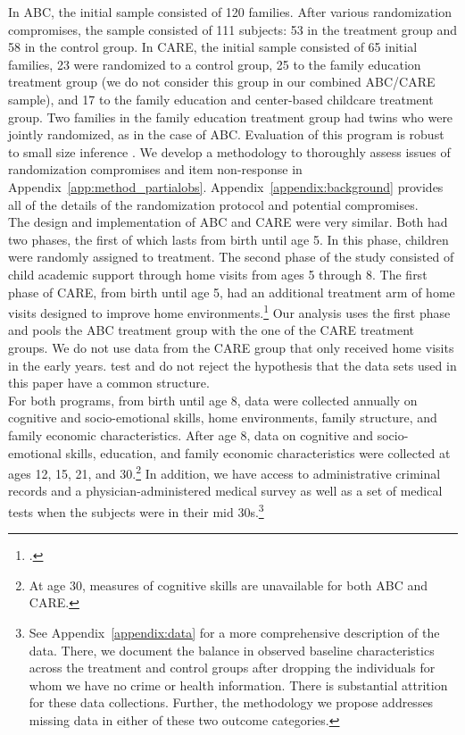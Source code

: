 \noindent In ABC, the initial sample consisted of 120 families. After various randomization compromises, the sample consisted of 111 subjects: 53 in the treatment group and 58 in the control group. In CARE, the initial sample consisted of 65 initial families, 23 were randomized to a control group, 25 to the family education treatment group (we do not consider this group in our combined ABC/CARE sample), and 17 to the family education and center-based childcare treatment group. Two families in the family education treatment group had twins who were jointly randomized, as in the case of ABC. Evaluation of this program is robust to small size inference \citep{Campbell_Conti_etal_2014_EarlyChildhoodInvestments}. We  develop a methodology to thoroughly assess issues of randomization compromises and item non-response in Appendix~\ref{app:method_partialobs}. Appendix~\ref{appendix:background} provides all of the details of the randomization protocol and potential compromises.\\

\noindent The design and implementation of ABC and CARE were very similar. Both had two phases, the first of which lasts from birth until age 5. In this phase, children were randomly assigned to treatment. The second phase of the study consisted of child academic support through home visits from ages 5 through 8. The first phase of CARE, from birth until age 5, had an additional treatment arm of home visits designed to improve home environments.\footnote{\citet{Wasik_Ramey_etal_1990_CD}.} Our analysis uses the first phase and pools the ABC treatment group with the one of the CARE treatment groups. We do not use data from the CARE group that only received home visits in the early years. \cite{Campbell_Conti_etal_2014_EarlyChildhoodInvestments} test and do not reject the hypothesis that the data sets used in this paper have a common structure.\\

\noindent For both programs, from birth until age 8, data were collected annually on cognitive and socio-emotional skills, home environments, family structure, and family economic characteristics. After age 8, data on cognitive and socio-emotional skills, education, and family economic characteristics were collected at ages 12, 15, 21, and 30.\footnote{At age 30, measures of cognitive skills are unavailable for both ABC and CARE.} In addition, we have access to administrative criminal records and a physician-administered medical survey as well as a set of medical tests when the subjects were in their mid 30s.\footnote{See  Appendix~\ref{appendix:data} for a more comprehensive description of the data. There, we document the balance in observed baseline characteristics across the treatment and control groups after dropping the individuals for whom we have no crime or health information. There is substantial attrition for these data collections. Further, the methodology we propose addresses missing data in either of these two outcome categories.}\\

